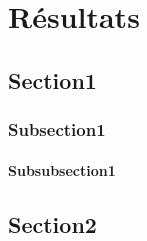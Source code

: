 \chapter{Résultats}
\section{Section1}
\subsection{Subsection1}
\subsubsection{Subsubsection1}
\lipsum[1-3]
\section{Section2}
\lipsum[1-3]
